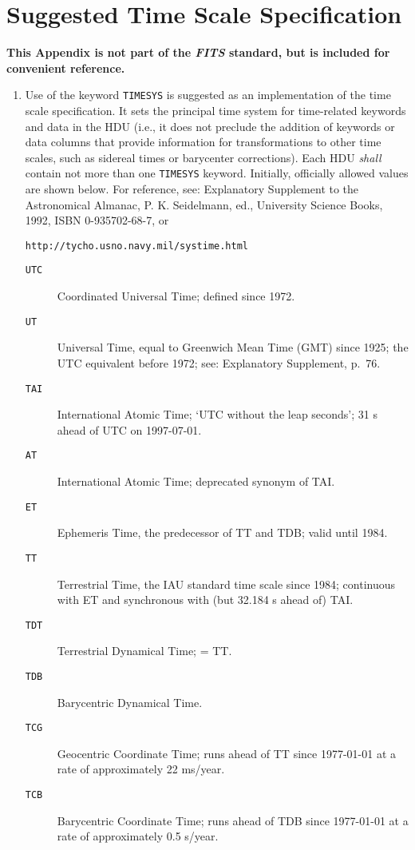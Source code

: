 \documentclass[11pt,makeidx]{book}     %
\begin{document}


\chapter{Suggested Time Scale Specification}
\label{s:tsys} 
   {\bf This Appendix is not part of the {\em FITS\/} standard, 
   but is included
   for convenient reference.}

\begin{enumerate} 
\item Use of the keyword {\tt TIMESYS} is suggested 
   as an implementation of the time
   scale specification.  It sets the principal time system for time-related
   keywords and data in the HDU (i.e., it does not preclude the addition of
   keywords or data columns that provide information for transformations to
   other time scales, such as sidereal times or barycenter corrections).
   Each HDU {\em shall} contain not more than one {\tt TIMESYS} keyword.
   Initially, officially allowed values are shown below.
      For reference, see:
      Explanatory Supplement to the Astronomical Almanac, P. K. Seidelmann,
        ed., University Science Books, 1992, ISBN 0-935702-68-7, or
   \begin{center}
      {\tt http://tycho.usno.navy.mil/systime.html}
   \end{center}
   
  \begin{description}    
   \item[{\tt UTC}] Coordinated Universal Time; defined since 1972.
   \item[{\tt UT}]  Universal Time, equal to Greenwich Mean Time (GMT) 
              since 1925; the UTC equivalent before 1972;
              see: Explanatory Supplement, p.\ 76.
   \item[{\tt TAI}] International Atomic Time; `UTC without the 
              leap seconds'; 31 s ahead of UTC on 1997-07-01.
   \item[{\tt AT}]  International Atomic Time; deprecated synonym of TAI.
   \item[{\tt ET}]  Ephemeris Time, the predecessor of TT and TDB; valid until 
              1984.
   \item[{\tt TT}]  Terrestrial Time, the IAU standard time scale since 1984;
              continuous with ET and synchronous with (but 32.184 s 
              ahead of) TAI.
   \item[{\tt TDT}] Terrestrial Dynamical Time; = TT.
   \item[{\tt TDB}] Barycentric Dynamical Time.
   \item[{\tt TCG}] Geocentric Coordinate Time; runs ahead of TT since 
              1977-01-01 at a rate of approximately 22 ms/year.
   \item[{\tt TCB}] Barycentric Coordinate Time; runs ahead of TDB since 
              1977-01-01 at a rate of approximately 0.5 s/year.
  \end{description}


\end{enumerate}
\end{document}
